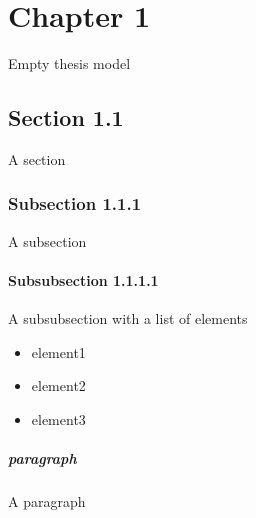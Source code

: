 \chapter{Chapter 1}
Empty thesis model
\section{Section 1.1}
A section
\subsection{Subsection 1.1.1}
A subsection
\subsubsection{Subsubsection 1.1.1.1}
A subsubsection with a list of elements
\begin{itemize}
	\item element1
	\item element2
	\item element3
\end{itemize}
\paragraph{paragraph} A paragraph